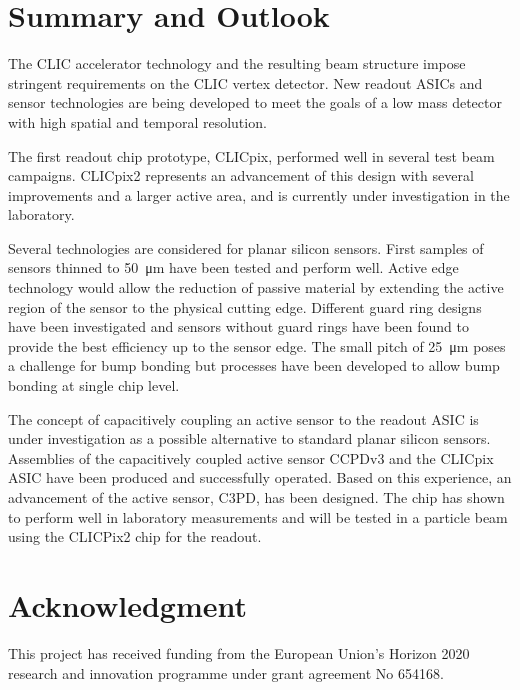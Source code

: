\documentclass[a4paper,11pt]{article}
\begin{document}
\section{Summary and Outlook}
\label{sec:summary}

The CLIC accelerator technology and the resulting beam structure impose stringent requirements on the CLIC vertex detector.
New readout ASICs and sensor technologies are being developed to meet the goals of a low mass detector with high spatial and temporal resolution.

The first readout chip prototype, CLICpix, performed well in several test beam campaigns.
CLICpix2 represents an advancement of this design with several improvements and a larger active area, and is currently under investigation in the laboratory.

Several technologies are considered for planar silicon sensors.
First samples of sensors thinned to \SI{50}{\um} have been tested and perform well.
Active edge technology would allow the reduction of passive material by extending the active region of the sensor to the physical cutting edge.
Different guard ring designs have been investigated and sensors without guard rings have been found to provide the best efficiency up to the sensor edge.
The small pitch of \SI{25}{\um} poses a challenge for bump bonding but processes have been developed to allow bump bonding at single chip level.

The concept of capacitively coupling an active sensor to the readout ASIC is under investigation as a possible alternative to standard planar silicon sensors.
Assemblies of the capacitively coupled active sensor CCPDv3 and the CLICpix ASIC have been produced and successfully operated.
Based on this experience, an advancement of the active sensor, C3PD, has been designed.
The chip has shown to perform well in laboratory measurements and will be tested in a particle beam using the CLICPix2 chip for the readout.


\section*{Acknowledgment}

This project has received funding from the European Union's Horizon 2020 research and innovation programme under grant agreement No 654168.


%


\end{document}
